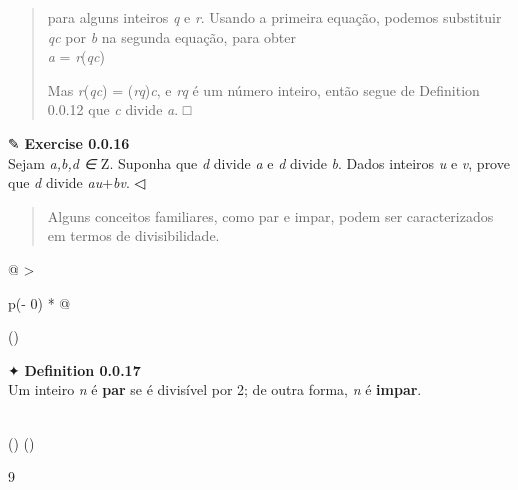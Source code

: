 \documentclass[
]{article}
\begin{document}
\begin{quote}
para alguns inteiros \emph{q} e \emph{r}. Usando a primeira equação,
podemos substituir \emph{qc} por \emph{b} na segunda equação, para
obter\\
\emph{a} = \emph{r}(\emph{qc})

Mas \emph{r}(\emph{qc}) = (\emph{rq})\emph{c}, e \emph{rq} é um número
inteiro, então segue de Definition 0.0.12 que \emph{c} divide \emph{a}.
□
\end{quote}

✎ \textbf{Exercise 0.0.16}\\
Sejam \emph{a,b,d ∈} Z. Suponha que \emph{d} divide \emph{a} e \emph{d}
divide \emph{b}. Dados inteiros \emph{u} e \emph{v}, prove que \emph{d}
divide \emph{au}+\emph{bv}. ◁

\begin{quote}
Alguns conceitos familiares, como par e impar, podem ser caracterizados
em termos de divisibilidade.
\end{quote}

\begin{longtable}[]{@{}
  >{\raggedright\arraybackslash}p{(\columnwidth - 0\tabcolsep) * }@{}}
\toprule()
\begin{minipage}[b]{\linewidth}\raggedright
✦ \textbf{Definition 0.0.17}\\
Um inteiro \emph{n} é \textbf{par} se é divisível por 2; de outra forma,
\emph{n} é \textbf{impar}.\strut
\end{minipage} \\
\midrule()
\endhead
\bottomrule()
\end{longtable}

9
\end{document}
